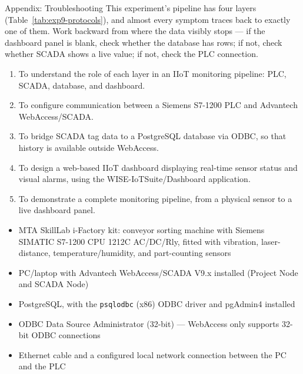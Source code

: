 \begin{labsection}{Appendix: Troubleshooting}{}
  This experiment's pipeline has four layers (Table~\ref{tab:exp9-protocols}), and almost every symptom traces back to exactly one of them. Work backward from where the data visibly stops --- if the dashboard panel is blank, check whether the database has rows; if not, check whether SCADA shows a live value; if not, check the PLC connection.

  \begin{objectives}
    \begin{enumerate}
      \item To understand the role of each layer in an IIoT monitoring pipeline: PLC, SCADA, database, and dashboard.
      \item To configure communication between a Siemens S7-1200 PLC and Advantech WebAccess/SCADA.
      \item To bridge SCADA tag data to a PostgreSQL database via ODBC, so that history is available outside WebAccess.
      \item To design a web-based IIoT dashboard displaying real-time sensor status and visual alarms, using the WISE-IoTSuite/Dashboard application.
      \item To demonstrate a complete monitoring pipeline, from a physical sensor to a live dashboard panel.
    \end{enumerate}
  \end{objectives}

  \begin{equipment}
    \begin{itemize}
      \item MTA SkillLab i-Factory kit: conveyor sorting machine with Siemens SIMATIC S7-1200 CPU 1212C AC/DC/Rly, fitted with vibration, laser-distance, temperature/humidity, and part-counting sensors
      \item PC/laptop with Advantech WebAccess/SCADA V9.x installed (Project Node and SCADA Node)
      \item PostgreSQL, with the \texttt{psqlodbc} (x86) ODBC driver and pgAdmin4 installed
      \item ODBC Data Source Administrator (32-bit) --- WebAccess only supports 32-bit ODBC connections
      \item Ethernet cable and a configured local network connection between the PC and the PLC
    \end{itemize}
  \end{equipment}
  \newpage


\end{labsection}
